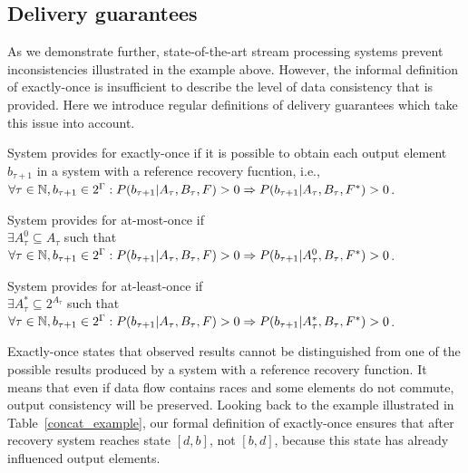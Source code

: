 \subsection{Delivery guarantees}

As we demonstrate further, state-of-the-art stream processing systems prevent inconsistencies illustrated in the example above. However, the informal definition of exactly-once is insufficient to describe the level of data consistency that is provided. Here we introduce regular definitions of delivery guarantees which take this issue into account. 

\begin{definition}{System provides for exactly-once}
if it is possible to obtain each output element $b_{\tau+1}$ in a system with a reference recovery fucntion, i.e.,\\ 
$\forall{\tau \in \mathbb{N}}, b_{\tau+1}\in 2^{\Gamma}: P(b_{\tau+1}|A_{\tau},B_\tau,F)>0 \Rightarrow \\ P(b_{\tau+1}|A_{\tau},B_\tau,F^{*})>0$.
\end{definition}

\begin{definition}{System provides for at-most-once}
if \\
$\exists{A^{0}_{\tau}\subseteq{A_{\tau}}}$ such that \\
$\forall{\tau \in \mathbb{N},{b_{\tau+1}\in 2^{\Gamma}}}: P(b_{\tau+1}|A_{\tau},B_\tau,F)>0 \Rightarrow \\ P(b_{\tau+1}|A^{0}_{\tau},B_\tau,F^{*})>0$.
\end{definition}

\begin{definition}{System provides for at-least-once}
if \\
$\exists{A^{*}_{\tau}\subseteq{2^{A_{\tau}}}}$ such that \\
$\forall{\tau \in \mathbb{N}, {b_{\tau+1} \in 2^{\Gamma}}}: P(b_{\tau+1}|A_{\tau},B_\tau,F)>0 \Rightarrow \\ P(b_{\tau+1}|A^{*}_{\tau},B_\tau,F^{*})>0$.
\end{definition}

Exactly-once states that observed results cannot be distinguished from one of the possible results produced by a system with a reference recovery function. It means that even if data flow contains races and some elements do not commute, output consistency will be preserved. Looking back to the example illustrated in Table~\ref{concat_example}, our formal definition of exactly-once ensures that after recovery system reaches state $[d,b]$, not $[b,d]$, because this state has already influenced output elements.

